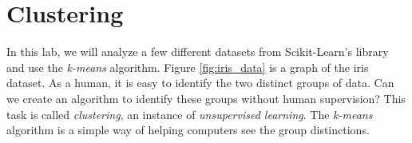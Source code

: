 





\section*{Clustering}

In this lab, we will analyze a few different datasets from Scikit-Learn's library and use the \emph{k-means} algorithm.
Figure \ref{fig:iris_data} is a graph of the iris dataset.
As a human, it is easy to identify the two distinct groups of data.
Can we create an algorithm to identify these groups without human supervision?
This task is called \emph{clustering}, an instance of \emph{unsupervised learning}.
The \emph{k-means} algorithm is a simple way of helping computers see the group distinctions.

